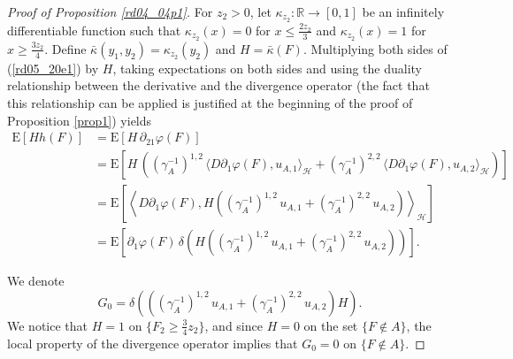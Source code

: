 \documentclass[12pt,a4paper]{article}
\newcommand{\R}{{\mathbb{R}}}
\newcommand{\E}{\mathrm{E}}
\newcommand{\HH}{\mathcal{H}}
\newcommand{\<}{\langle}
\renewcommand{\>}{\rangle}
\begin{document}
\begin{proof}[Proof of Proposition \ref{rd04_04p1}]
     
       For $z_2 > 0$, let $\kappa_{z_2}:\R\rightarrow [0,1]$ be an infinitely differentiable function such that $\kappa_{z_2}(x)=0$ for $x\le \frac {2z_2}3$ and $\kappa_{z_2}(x)=1 $ for $x\ge \frac {3z_2}4$. Define $\bar{\kappa}(y_1,y_2)=\kappa_{z_2}(y_2)$
   and $H=\bar{\kappa}(F)$. Multiplying both sides of (\ref{rd05_20e1}) by $H$, taking expectations on both sides and using the duality relationship between the derivative and the divergence operator \cite[(1.42) p.~37]{nualart2006} (the fact that this relationship can be applied is justified at the beginning of the proof of Proposition \ref{prop1}) yields
\begin{align} \nonumber 
   \E[H h(F)] &=  \E\left[H\, \partial_{2 1} \varphi(F)\right] \\ \nonumber
   &=   \E\left[H\,\left( (\gamma_{A}^{-1})^{1,2}\, \langle D\partial_1 \varphi(F), u_{A,1}\rangle_\HH +  (\gamma_{A}^{-1})^{2,2}\, \langle D\partial_1 \varphi(F), u_{A,2}\rangle_\HH\right)\right] \\ \nonumber
   &= \E\left[\left\langle D\partial_1 \varphi(F), H\left( (\gamma_{A}^{-1})^{1,2}\, u_{A,1} + (\gamma_{A}^{-1})^{2,2}\,  u_{A,2}\right)\right\rangle_\HH\right]\\ 
    & =\E \left[\partial_1 \varphi(F)\,  \delta\left (  H\left( (\gamma_{A}^{-1}) ^{1,2}\, u_{A,1}  +  (\gamma_{A}^{-1}) ^{2,2}\, u_{A,2} \right) \right)\right].
    \label{for7a}
 \end{align}
 
  We denote
\begin{equation}\label{rd04_07e3}
   G_0=\delta\left ( \left((\gamma_{A}^{-1}) ^{1,2} \, u_{A,1}  + (\gamma_{A}^{-1}) ^{2,2}\, u_{A,2} \right) H \right).
\end{equation}
We notice that $H=1$ on $\{F_2\ge \frac 34 z_2\}$, and since $H=0$ on the set  $\{F \not \in A\}$, the local property of the divergence operator \cite[Proposition 1.3.15]{nualart2006} implies that $G_0=0$ on $\{F \not \in A\}$.
    

\end{proof}
\end{document}
